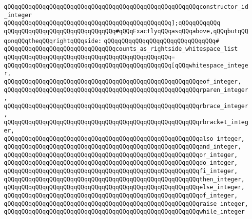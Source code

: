 \verb|qQQqqQQqqQQqqQQqqQQqqQQqqQQqqQQqqQQqqQQqqQQqqQQqqQQqqQQqconstructor_id_integer|\newline
\verb|qQQqqQQqqQQqqQQqqQQqqQQqqQQqqQQqqQQqqQQqqQQqqQQq];qQQqqQQqqQQq|\newline
\newline
\verb|qQQqqQQqqQQqqQQqqQQqqQQqqQQqqQQq#qQQqExactlyqQQqasqQQqabove,qQQqbutqQQqonqQQqtheqQQqrightqQQqside:|\newline
\verb|qQQqqQQqqQQqqQQqqQQqqQQqqQQqqQQq#|\newline
\verb|qQQqqQQqqQQqqQQqqQQqqQQqqQQqqQQqcounts_as_rightside_whitespace_list|\newline
\verb|qQQqqQQqqQQqqQQqqQQqqQQqqQQqqQQqqQQqqQQqqQQqqQQq=|\newline
\verb|qQQqqQQqqQQqqQQqqQQqqQQqqQQqqQQqqQQqqQQqqQQqqQQq[qQQqwhitespace_integer,|\newline
\verb|qQQqqQQqqQQqqQQqqQQqqQQqqQQqqQQqqQQqqQQqqQQqqQQqqQQqqQQqeof_integer,|\newline
\verb|qQQqqQQqqQQqqQQqqQQqqQQqqQQqqQQqqQQqqQQqqQQqqQQqqQQqqQQqrparen_integer,|\newline
\verb|qQQqqQQqqQQqqQQqqQQqqQQqqQQqqQQqqQQqqQQqqQQqqQQqqQQqqQQqrbrace_integer,|\newline
\verb|qQQqqQQqqQQqqQQqqQQqqQQqqQQqqQQqqQQqqQQqqQQqqQQqqQQqqQQqrbracket_integer,|\newline
\verb|qQQqqQQqqQQqqQQqqQQqqQQqqQQqqQQqqQQqqQQqqQQqqQQqqQQqqQQqalso_integer,|\newline
\verb|qQQqqQQqqQQqqQQqqQQqqQQqqQQqqQQqqQQqqQQqqQQqqQQqqQQqqQQqand_integer,|\newline
\verb|qQQqqQQqqQQqqQQqqQQqqQQqqQQqqQQqqQQqqQQqqQQqqQQqqQQqqQQqor_integer,|\newline
\verb|qQQqqQQqqQQqqQQqqQQqqQQqqQQqqQQqqQQqqQQqqQQqqQQqqQQqqQQqdo_integer,|\newline
\verb|qQQqqQQqqQQqqQQqqQQqqQQqqQQqqQQqqQQqqQQqqQQqqQQqqQQqqQQqfi_integer,|\newline
\verb|qQQqqQQqqQQqqQQqqQQqqQQqqQQqqQQqqQQqqQQqqQQqqQQqqQQqqQQqthen_integer,|\newline
\verb|qQQqqQQqqQQqqQQqqQQqqQQqqQQqqQQqqQQqqQQqqQQqqQQqqQQqqQQqelse_integer,|\newline
\verb|qQQqqQQqqQQqqQQqqQQqqQQqqQQqqQQqqQQqqQQqqQQqqQQqqQQqqQQqof_integer,|\newline
\verb|qQQqqQQqqQQqqQQqqQQqqQQqqQQqqQQqqQQqqQQqqQQqqQQqqQQqqQQqraise_integer,|\newline
\verb|qQQqqQQqqQQqqQQqqQQqqQQqqQQqqQQqqQQqqQQqqQQqqQQqqQQqqQQqwhile_integer|\newline
